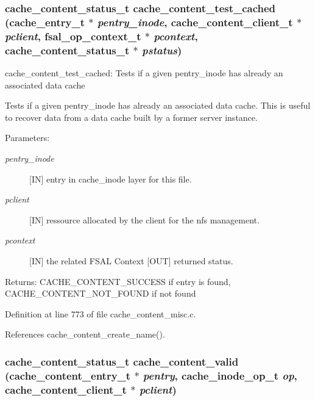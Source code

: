 \subsubsection{\setlength{\rightskip}{0pt plus 5cm}cache\_\-content\_\-status\_\-t cache\_\-content\_\-test\_\-cached (cache\_\-entry\_\-t $\ast$ {\em pentry\_\-inode}, cache\_\-content\_\-client\_\-t $\ast$ {\em pclient}, fsal\_\-op\_\-context\_\-t $\ast$ {\em pcontext}, cache\_\-content\_\-status\_\-t $\ast$ {\em pstatus})}\label{cache__content__misc_8c_a17}


cache\_\-content\_\-test\_\-cached: Tests if a given pentry\_\-inode has already an associated data cache

Tests if a given pentry\_\-inode has already an associated data cache. This is useful to recover data from a data cache built by a former server instance.

\begin{Desc}
\item[Parameters:]
\begin{description}
\item[{\em pentry\_\-inode}][IN] entry in cache\_\-inode layer for this file. \item[{\em pclient}][IN] ressource allocated by the client for the nfs management. \item[{\em pcontext}][IN] the related FSAL Context  [OUT] returned status.\end{description}
\end{Desc}
\begin{Desc}
\item[Returns:]CACHE\_\-CONTENT\_\-SUCCESS if entry is found, CACHE\_\-CONTENT\_\-NOT\_\-FOUND if not found \end{Desc}


Definition at line 773 of file cache\_\-content\_\-misc.c.

References cache\_\-content\_\-create\_\-name().
\subsubsection{\setlength{\rightskip}{0pt plus 5cm}cache\_\-content\_\-status\_\-t cache\_\-content\_\-valid (cache\_\-content\_\-entry\_\-t $\ast$ {\em pentry}, cache\_\-inode\_\-op\_\-t {\em op}, cache\_\-content\_\-client\_\-t $\ast$ {\em pclient})}\label{cache__content__misc_8c_a14}


